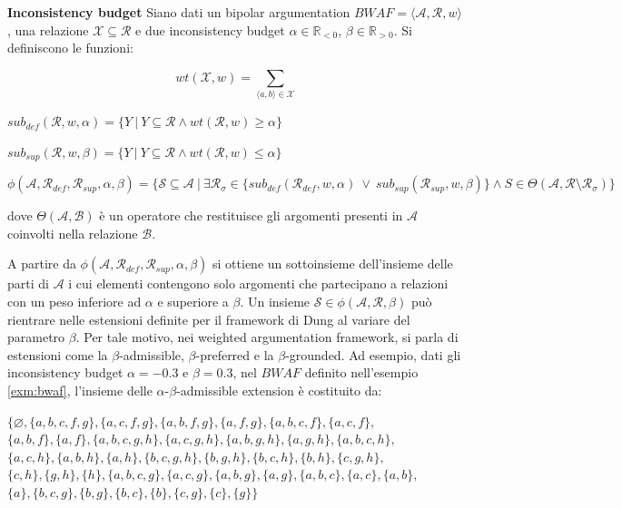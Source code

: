 \bigskip
\begin{defn} \textbf{Inconsistency budget}
Siano dati un bipolar argumentation $BWAF = ⟨\mathcal{A}, \mathcal{R}, w⟩$, una relazione $\mathcal{X} \subseteq \mathcal{R}$ e due inconsistency budget $\alpha \in \mathbb{R}_{<0}$, $\beta \in \mathbb{R}_{>0}$. Si definiscono le funzioni:

    \begin{center}
        
        $$wt(\mathcal{X}, w) = \sum_{⟨a, b⟩ \in \mathcal{X}}$$
        
        $sub_{def}(\mathcal{R},w,\alpha) = \{Y \ | \ Y \subseteq \mathcal{R} \land wt(\mathcal{R},w) \geq \alpha \}$
        
        $sub_{sup}(\mathcal{R},w,\beta) = \{Y \ | \ Y \subseteq \mathcal{R} \land wt(\mathcal{R},w) \leq \alpha \}$
        
        $\phi(\mathcal{A}, \mathcal{R}_{def}, \mathcal{R}_{sup}, \alpha, \beta) = 
        \{\mathcal{S} \subseteq \mathcal{A} \ | \ \exists \mathcal{R}_{\sigma} \in \{sub_{def}(\mathcal{R}_{def}, w, \alpha) \ \lor \ sub_{sup}(\mathcal{R}_{sup}, w, \beta) \} \land S \in \Theta (\mathcal{A}, \mathcal{R} \setminus \mathcal{R}_{\sigma}) \}$
        
    \end{center}
    
    dove $\Theta(\mathcal{A}, \mathcal{B})$ è un operatore che restituisce gli argomenti presenti in  $\mathcal{A}$ coinvolti nella relazione $\mathcal{B}$.

\end{defn}

A partire da $\phi(\mathcal{A}, \mathcal{R}_{def}, \mathcal{R}_{sup}, \alpha, \beta)$ si ottiene un sottoinsieme dell'insieme delle parti di $\mathcal{A}$ i cui elementi contengono solo argomenti che partecipano a relazioni con un peso inferiore ad $\alpha$ e superiore a $\beta$. Un insieme $\mathcal{S} \in \phi(\mathcal{A}, \mathcal{R}, \beta)$ può rientrare nelle estensioni definite per il framework di Dung al variare del parametro $\beta$. Per tale motivo, nei weighted argumentation framework, si parla di estensioni come la $\beta$-admissible, $\beta$-preferred e la $\beta$-grounded.
Ad esempio, dati gli inconsistency budget $\alpha = -0.3$ e $\beta = 0.3$, nel $BWAF$ definito nell'esempio \ref{exm:bwaf}, l'insieme delle $\alpha$-$\beta$-admissible extension è costituito da:  

\begin{center}
    $\{\varnothing,\{a,b,c,f,g\},\{a,c,f,g\},\{a,b,f,g\},\{a,f,g\},\{a,b,c,f\},\{a,c,f\},$ \\ 
    $\{a,b,f\},\{a,f\},\{a,b,c,g,h\},\{a,c,g,h\},\{a,b,g,h\},\{a,g,h\},\{a,b,c,h\},$ \\ 
    $\{a,c,h\},\{a,b,h\},\{a,h\},\{b,c,g,h\},\{b,g,h\},\{b,c,h\},\{b,h\},\{c,g,h\},$ \\ 
    $\{c,h\},\{g,h\},\{h\},\{a,b,c,g\},\{a,c,g\},\{a,b,g\},\{a,g\},\{a, b, c\}, \{a, c\}, \{a, b\},$ \\
    $\{a\}, \{b, c, g\}, \{b, g\},\{b, c\}, \{b\}, \{c, g\}, \{c\}, \{g\}\}$
\end{center}

